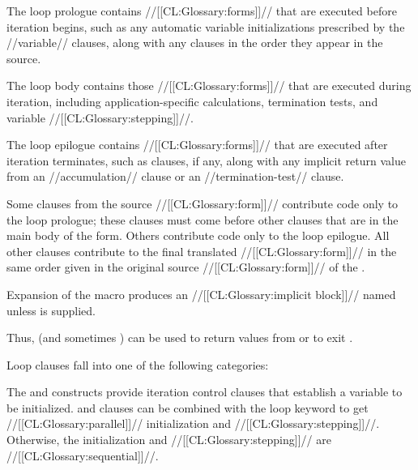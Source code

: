\beginlist
{}
 
The loop prologue contains //[[CL:Glossary:forms]]// 
that are executed before iteration begins, such as
any automatic variable initializations prescribed 
by the //variable// clauses, along with any  clauses
in the order they appear in the source.
 
 
The loop body contains those //[[CL:Glossary:forms]]// that are executed during iteration, 
including application-specific calculations, termination tests,
and variable //[[CL:Glossary:stepping]]//.
                           
 
The loop epilogue contains //[[CL:Glossary:forms]]// that are executed after iteration 
terminates, such as  clauses, if any, along
with any implicit return value from an //accumulation// clause or
an //termination-test// clause.

\endlist
 

Some clauses from the source //[[CL:Glossary:form]]//
contribute code only to the loop prologue; these clauses must
  come before other clauses that are in the main body of the  form.            
  Others contribute code only to the loop epilogue.
  All other clauses contribute to the final 
translated //[[CL:Glossary:form]]// in the same 
  order given in the original source //[[CL:Glossary:form]]// of the .


Expansion of the  macro produces an //[[CL:Glossary:implicit block]]// named \nil\ 
unless  is supplied.

Thus,  (and sometimes )
can be used to return values from  or to exit .




\endsubsubsection%

 

Loop clauses fall into one of the following categories:
 

The  and  constructs provide iteration control clauses
that establish a variable to be initialized.
 and  clauses can be combined with the loop
keyword \loopref{and} to get //[[CL:Glossary:parallel]]// initialization and //[[CL:Glossary:stepping]]//.
Otherwise, the initialization and //[[CL:Glossary:stepping]]//\meaning{1} are //[[CL:Glossary:sequential]]//.






